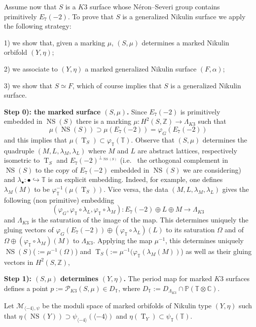 \documentclass{amsart}
\theoremstyle{definition}
\numberwithin{equation}{section}
\numberwithin{equation}{section} \theoremstyle{definition}
\DeclareMathOperator{\NS}{NS}
\DeclareMathOperator{\T}{T}
\newcommand{\ra}{\rightarrow}
\newcommand\Z{\mathbb{Z}}
\begin{document}
Assume now that $S$ is a $K3$ surface whose N\'eron--Severi group contains primitively $E_7(-2)$. To prove that $S$ is a generalized Nikulin surface we apply the following strategy: 

1) we show that, given a marking $\mu$, $(S,\mu)$ determines a marked Nikulin orbifold $(Y,\eta)$; 

2) we associate to $(Y,\eta)$ a marked generalized Nikulin surface $(F,\alpha)$; 

3) we show that $S\simeq F$, which of course implies that $S$ is a generalized Nikulin surface.

{\bf Step 0): the marked surface $(S,\mu)$.} Since $E_7(-2)$ is primitively embedded in $\NS(S)$ there is a marking $\mu:H^2(S,\Z)\ra \Lambda_{K3}$ such that $$ \mu(\NS(S))\supset \mu(E_7(-2))=\varphi_G(E_7(-2))$$ and this implies that $\mu(\T_S)\subset \varphi_{\mathbb{T}}(\mathbb{T})$. Observe that $(S,\mu)$ determines the quadruple $(M,L,\lambda_M, \lambda_L)$ where $M$ and $L$ are abstract lattices, respectively isometric to $\T_S$ and $E_7(-2)^{\perp_{\NS(S)}}$ (i.e.~ the orthogonal complement in $\NS(S)$ to the copy of $E_7(-2)$ embedded in $\NS(S)$ we are considering) and $\lambda_{\bullet}:\bullet\hookrightarrow \mathbb{T}$ is an explicit embedding. Indeed, for example, one defines $\lambda_M(M)$ to be $\varphi_{\mathbb{T}}^{-1}(\mu(\T_S))$. Vice versa, the data  
$(M,L,\lambda_M, \lambda_L)$ gives the following (non primitive) embedding $$(\varphi_G, \varphi_{\mathbb{T}}\circ \lambda_L,\varphi_{\mathbb{T}}\circ\lambda_M):E_7(-2)\oplus L\oplus M\ra \Lambda_{K3}$$ and  $\Lambda_{K3}$ is the saturation of the image of the map. This determines uniquely the gluing vectors of $\varphi_G(E_7(-2))\oplus  (\varphi_{\mathbb{T}}\circ \lambda_L)(L)$ to its saturation $\Omega$ and of $\Omega\oplus  (\varphi_{\mathbb{T}}\circ \lambda_M)(M)$ to $\Lambda_{K3}$. Applying the map $\mu^{-1}$, this determines uniquely $\NS(S)$($:=\mu^{-1}(\Omega)$) and $\T_S$($:=\mu^{-1}(\varphi_{\mathbb{T}}(\lambda_M(M))$) as well as their gluing vectors in $H^2(S,\Z)$,




{\bf Step 1): $(S,\mu)$ determines $(Y,\eta)$.}
The period map for marked $K3$ surfaces defines a point $p:=\mathcal{P}_{K3}(S,\mu)\in D_{\mathbb{T}}$, where $D_{\mathbb{T}}:=D_{\Lambda_{K3}}\cap\mathbb{P}(\mathbb{T}\otimes\mathbb{C})$. 

Let $\mathcal{M}_{\langle -4\rangle,\psi}$ be the moduli space of marked orbifolds of Nikulin type $(Y,\eta)$ such that $\eta(\NS(Y))\supset \psi_{\langle -4\rangle}(\langle -4\rangle)$ and $\eta(\T_Y)\subset \psi_{\mathbb{T}}(\mathbb{T})$.
\end{document}
